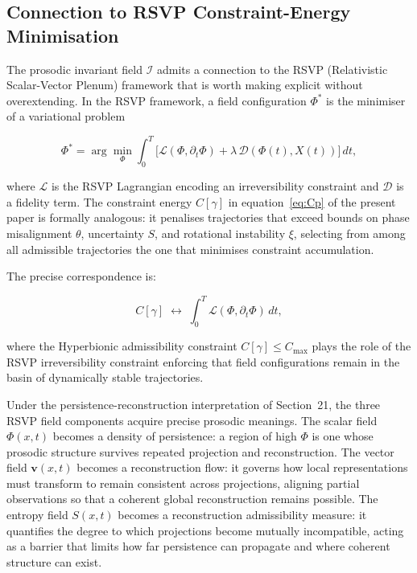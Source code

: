 \documentclass[12pt, a4paper]{article}
\begin{document}
\subsection{Connection to RSVP Constraint-Energy Minimisation}

The prosodic invariant field $\mathcal{I}$ admits a connection to the RSVP (Relativistic Scalar-Vector Plenum) framework that is worth making explicit without overextending. In the RSVP framework, a field configuration $\Phi^*$ is the minimiser of a variational problem

\begin{equation}
\Phi^* = \arg\min_\Phi \int_0^T \bigl[\mathcal{L}(\Phi, \partial_t \Phi) + \lambda\, \mathcal{D}(\Phi(t), X(t))\bigr]\, dt,
\label{eq:RSVPvar}
\end{equation}

where $\mathcal{L}$ is the RSVP Lagrangian encoding an irreversibility constraint and $\mathcal{D}$ is a fidelity term. The constraint energy $C[\gamma]$ in equation~\eqref{eq:Cp} of the present paper is formally analogous: it penalises trajectories that exceed bounds on phase misalignment $\theta$, uncertainty $S$, and rotational instability $\xi$, selecting from among all admissible trajectories the one that minimises constraint accumulation.

The precise correspondence is:

\begin{equation}
C[\gamma] \;\longleftrightarrow\; \int_0^T \mathcal{L}(\Phi, \partial_t\Phi)\, dt,
\label{eq:RSVPcorr}
\end{equation}

where the Hyperbionic admissibility constraint $C[\gamma] \leq C_{\max}$ plays the role of the RSVP irreversibility constraint enforcing that field configurations remain in the basin of dynamically stable trajectories.

Under the persistence-reconstruction interpretation of Section~21, the three RSVP field components acquire precise prosodic meanings. The scalar field $\Phi(x,t)$ becomes a density of persistence: a region of high $\Phi$ is one whose prosodic structure survives repeated projection and reconstruction. The vector field $\mathbf{v}(x,t)$ becomes a reconstruction flow: it governs how local representations must transform to remain consistent across projections, aligning partial observations so that a coherent global reconstruction remains possible. The entropy field $S(x,t)$ becomes a reconstruction admissibility measure: it quantifies the degree to which projections become mutually incompatible, acting as a barrier that limits how far persistence can propagate and where coherent structure can exist.
\end{document}
